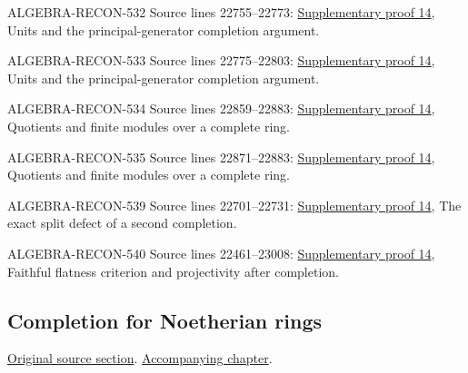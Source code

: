 \begin{AlgebraSourceRoutes}
\item[ALGEBRA-RECON-532] Source lines 22755--22773: \hyperlink{algebra_projectivity_completion_notes_20260927}{Supplementary proof 14}, Units and the principal-generator completion argument.
\item[ALGEBRA-RECON-533] Source lines 22775--22803: \hyperlink{algebra_projectivity_completion_notes_20260927}{Supplementary proof 14}, Units and the principal-generator completion argument.
\item[ALGEBRA-RECON-534] Source lines 22859--22883: \hyperlink{algebra_projectivity_completion_notes_20260927}{Supplementary proof 14}, Quotients and finite modules over a complete ring.
\item[ALGEBRA-RECON-535] Source lines 22871--22883: \hyperlink{algebra_projectivity_completion_notes_20260927}{Supplementary proof 14}, Quotients and finite modules over a complete ring.
\item[ALGEBRA-RECON-539] Source lines 22701--22731: \hyperlink{algebra_projectivity_completion_notes_20260927}{Supplementary proof 14}, The exact split defect of a second completion.
\item[ALGEBRA-RECON-540] Source lines 22461--23008: \hyperlink{algebra_projectivity_completion_notes_20260927}{Supplementary proof 14}, Faithful flatness criterion and projectivity after completion.
\end{AlgebraSourceRoutes}

\subsection{Completion for Noetherian rings}
\hypertarget{algebra-source-section-completion-noetherian}{}
\noindent\href{https://github.com/stacks/stacks-project/blob/a04446e57ec1fbc252a871afcec7752fb2807b14/algebra.tex\#L22893}{Original source section}. \href{algebra.pdf\#nameddest=section-completion-noetherian}{Accompanying chapter}.

